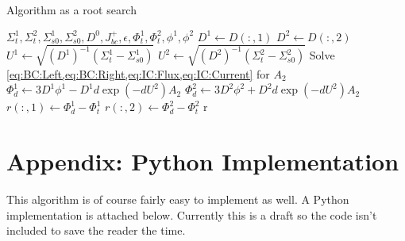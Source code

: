 \documentclass[a4paper,letterpaper,12pt,oneside,draft]{article}
\begin{document}
    \begin{algorithm}[H]\caption{Algorithm as a root search}\label{alg:root}
    \begin{algorithmic}[1]
        \Require $\Sigma_{t}^1,\Sigma_{t}^2,\Sigma_{s0}^1,\Sigma_{s0}^2,D^0,J^+_{bc},\epsilon, \Phi_{t}^1,\Phi_{t}^2, \phi^1,\phi^2$
        \State $D^1 \gets D(:,1)$
        \State $D^2 \gets D(:,2)$
        \State $U^1 \gets \sqrt{\left(D^1\right)^{-1}\left(\Sigma_{t}^1-\Sigma_{s0}^1\right)}$
        \State $U^2 \gets \sqrt{\left(D^2\right)^{-1}\left(\Sigma_{t}^2-\Sigma_{s0}^2\right)}$
        \State Solve \cref{eq:BC:Left,eq:BC:Right,eq:IC:Flux,eq:IC:Current} for $A_2$
        \State $\Phi_{d}^1 \gets 3D^1\phi^1 - D^1d\exp(-dU^2)A_2$
        \State $\Phi_{d}^2 \gets 3D^2\phi^2 + D^2d\exp(-dU^2)A_2$
        \State $r(:,1) \gets \Phi_{d}^1 - \Phi_{t}^1$
        \State $r(:,2) \gets \Phi_{d}^2 - \Phi_{t}^2$
        \State \Return r
        \EndFunction
        
        \State {}
    \end{algorithmic}
    \end{algorithm}
    
\appendix
\section{Appendix: Python Implementation}
    This algorithm is of course fairly easy to implement as well. A Python implementation is attached below. Currently this is a draft so the code isn't included to save the reader the time.
    
    
    
    
\end{document}
